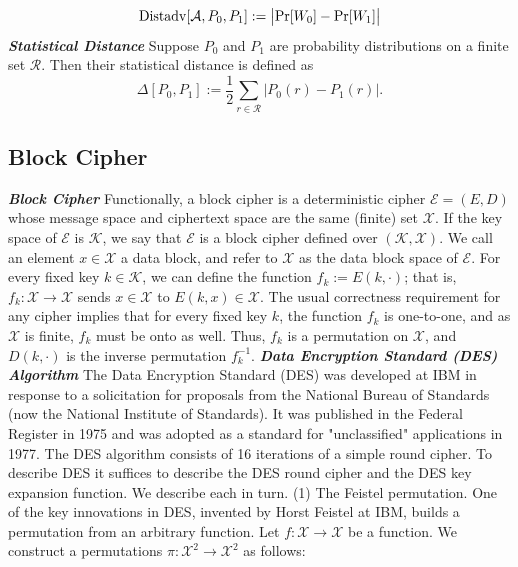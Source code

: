 \documentclass[a4paper,12pt,UTF8]{ctexart}
\begin{document}
\begin{spacing}{1.1}
\begin{equation}
{\rm Distadv}[\mathcal{A},P_0,P_1]:=\big|{\rm Pr}[W_0] - {\rm Pr}[W_1]\big|
\end{equation}
\indent\emph{\textbf{Statistical Distance}} Suppose $P_0$ and $P_1$ are probability distributions on a finite set $\mathcal{R}$. Then their statistical distance is defined as
\begin{equation}
\Delta[P_0,P_1] := \frac{1}{2} \sum_{r\in{\mathcal{R}}}|P_0(r)-P_1(r)|.
\end{equation}
\subsection{Block Cipher}
\emph{\textbf{Block Cipher}} Functionally, a block cipher is a deterministic cipher $\mathcal{E} =(E,D)$ whose message space and ciphertext space are the same (finite) set $\mathcal{X}$. If the key space of $\mathcal{E}$ is $\mathcal{K}$, we say that $\mathcal{E}$ is a block cipher defined over $(\mathcal{K},\mathcal{X})$. We call an element $x\in{\mathcal{X}}$ a data block, and refer to $\mathcal{X}$ as the data block space of $\mathcal{E}$. 
\newline\indent For every fixed key $k\in{\mathcal{K}}$, we can define the function $f_k :=E(k,\cdot)$; that is, $f_k:\mathcal{X}\rightarrow\mathcal{X}$ sends $x\in{\mathcal{X}}$ to $E(k,x) \in{\mathcal{X}}$. The usual correctness requirement for any cipher implies that for every fixed key $k$, the function $f_k$ is one-to-one, and as $\mathcal{X}$ is finite, $f_k$ must be onto as well. Thus, $f_k$ is a permutation on $\mathcal{X}$, and $D(k,\cdot)$ is the inverse permutation $f_k^{-1}$. \vspace{3mm}
\newline\indent\emph{\textbf{Data Encryption Standard (DES) Algorithm}} The Data Encryption Standard (DES) was developed at IBM in response to a solicitation for proposals from the National Bureau of Standards (now the National Institute of Standards). It was published in the Federal Register in 1975 and was adopted as a standard for "unclassified" applications in 1977. The DES algorithm consists of 16 iterations of a simple round cipher. To describe DES it suffices to describe the DES round cipher and the DES key expansion function. We describe each in turn.
\newline\indent(1) The Feistel permutation.
\newline\indent  One of the key innovations in DES, invented by Horst Feistel at IBM, builds a permutation from an arbitrary function. Let $f :\mathcal{X}\rightarrow\mathcal{X}$ be a function. We construct a permutations $\pi :\mathcal{X}^2\rightarrow\mathcal{X}^2$ as follows:

\end{spacing}
\end{document}
